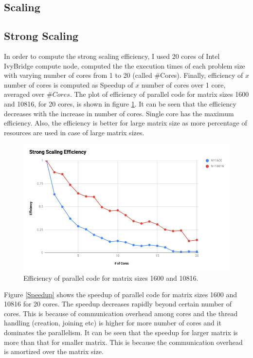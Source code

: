 \documentclass{article}
\begin{document}
\begin{spacing}{1.1}
\section{Scaling}

\subsection{Strong Scaling}
In order to compute the strong scaling efficiency, I used 20 cores of Intel IvyBridge compute node, computed the the execution times of each problem size with varying number of cores from 1 to 20 (called \#Cores). Finally, efficiency of $x$ number of cores is computed as Speedup of $x$ number of cores over 1 core, averaged over $\#Cores$.
The plot of efficiency of parallel code for matrix sizes 1600 and 10816, for 20 cores, is shown in figure \ref{eff}. It can be seen that the efficiency decreases with the increase in number of cores. Single core has the maximum efficiency. Also, the efficiency is better for large matrix size as more percentage of resources are used in case of large matrix sizes. 


\begin{center}
	\begin{figure}[H]
	\centering
       \includegraphics[scale=.40]{efficiency.png}
        \caption{\label{eff} Efficiency of parallel code for matrix sizes 1600 and 10816.} 
	\end{figure}
\end{center}

Figure \ref{Speedup} shows the speedup of parallel code for matrix sizes 1600 and 10816 for 20 cores. The speedup decreases rapidly beyond certain number of cores. This is because of communication overhead among cores and the thread handling (creation, joining etc) is higher for more number of cores and it dominates the parallelism. It can be seen that the speedup for larger matrix is more than that for smaller matrix. This is because the communication overhead is amortized over the matrix size. 


\end{spacing}
\end{document}
